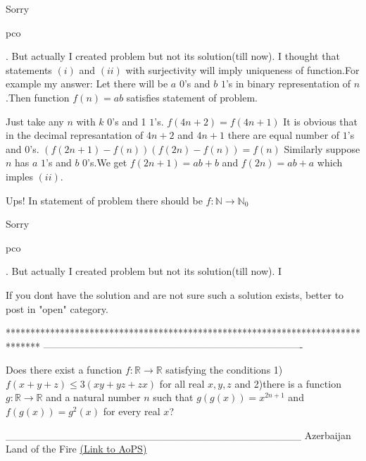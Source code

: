 \begin{solution}
	Sorry \begin{bolded}pco\end{bolded}. But actually I created problem but not its solution(till now). I thought that statements $(i)$ and $(ii)$ with surjectivity will imply uniqueness of function.For example my answer:
Let there will be $a$ $0$'s and $b$ $1$'s in binary representation of $n$.Then function $f(n)=ab$ satisfies statement of problem.
 Just take any $n$ with $k$ $0$'s and 1 $1$'s.
$f(4n+2)=f(4n+1)$
  It is obvious that in the decimal represantation of $4n+2$ and $4n+1$ there are equal number of $1$'s  and $0$'s.
$(f(2n+1)-f(n))(f(2n)-f(n))=f(n)$
Similarly suppose $n$ has $a$ $1$'s and $b$ $0$'s.We get $f(2n+1)=ab+b$ and  $f(2n)=ab+a$ which imples $(ii)$.
\end{solution}



\begin{solution}
	Ups! In statement of problem there should be $f:\mathbb{N} \to \mathbb{N}_0$
\end{solution}



\begin{solution}
	\begin{tcolorbox}Sorry \begin{bolded}pco\end{bolded}. But actually I created problem but not its solution(till now). I\end{tcolorbox}
If you dont have the solution and are not sure such a solution exists, better to post in "open" category.
\end{solution}
*******************************************************************************
-------------------------------------------------------------------------------

\begin{problem}
	Does there exist a function $f: \mathbb{R}\to\mathbb{R}$ satisfying the conditions
1)$ f(x+y+z){\leq}3(xy+yz+zx)$ for all real $x,y,z$ and 2)there is a function $g: \mathbb{R}\to\mathbb{R}$ and a natural number $n$
such that $g(g(x))=x^{2n+1}$ and $f(g(x))=g^2(x)$ for every real $x$?

________________________________________
Azerbaijan Land of the Fire 
	\flushright \href{https://artofproblemsolving.com/community/c6h534741}{(Link to AoPS)}
\end{problem}



